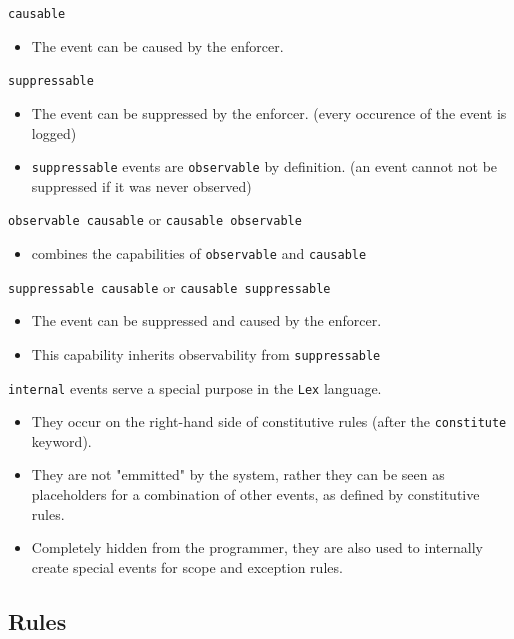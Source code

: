 \documentclass[runningheads]{llncs}
\newcommand{\Lex}{\texttt{Lex}}
\newcommand{\kw}[1]{{\color{purple}\texttt{#1}}}
\begin{document}
\kw{causable} 
\begin{itemize}[*]
  \item The event can be caused by the enforcer.
\end{itemize}

\kw{suppressable}
\begin{itemize}[*]
  \item The event can be suppressed by the enforcer. (every occurence of the event is logged)
  \item \kw{suppressable} events are \kw{observable} by definition. (an event cannot not be suppressed if it was never observed)
\end{itemize}

\kw{observable causable} or \kw{causable observable}
\begin{itemize}[*]
  \item combines the capabilities of \kw{observable} and \kw{causable}
\end{itemize}

\kw{suppressable causable} or \kw{causable suppressable}
\begin{itemize}[*]
  \item The event can be suppressed and caused by the enforcer.
  \item This capability inherits observability from \kw{suppressable}
\end{itemize}

\kw{internal} events serve a special purpose in the \Lex{} language.
\begin{itemize}[*]
  \item They occur on the right-hand side of constitutive rules (after the \kw{constitute} keyword).
  \item They are not "emmitted" by the system, rather they can be seen as placeholders for a combination of other events, as defined by constitutive rules.
  \item Completely hidden from the programmer, they are also used to internally create special events for scope and exception rules.
\end{itemize}

\subsection{Rules}
\end{document}
